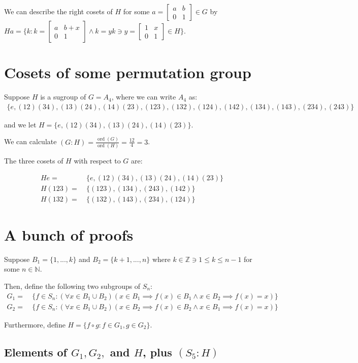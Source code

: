 \documentclass[12pt]{article}
\newcommand{\nats}{\mathbb{N}}
\newcommand{\ints}{\mathbb{Z}}
\newcommand{\glmatrix}[4]{\ensuremath{\begin{bmatrix} #1 & #2 \\ #3 & #4 \end{bmatrix}}}
\newcommand{\ord}{\operatorname{ord}}
\begin{document}
We can describe the right cosets of $H$ 
for some $a = \glmatrix{a}{b}{0}{1} \in G$
by $Ha = \Big\{k: k = \glmatrix{a}{b + x}{0}{1} \land k = yk \ni y = \glmatrix{1}{x}{0}{1} \in H \Big\}$.

\section{Cosets of some permutation group}

Suppose $H$ is a sugroup of $G = A_4$, where we can write $A_4$ as:
\begin{align} \label{a4}
	\{e, (12)(34), (13)(24),(14)(23),(123),(132),(124),(142),(134),(143),(234),(243)\}
\end{align}

and we let $H = \{ e, (12)(34), (13)(24),(14)(23) \}$.

We can calculate $(G:H) = \frac{\ord(G)}{\ord(H)} = \frac{12}{4} = 3$.

The three cosets of $H$ with respect to $G$ are:

\begin{align}
	He = &\ \{e, (12)(34), (13)(24),(14)(23) \} \\
	H(123) = &\ \{(123), (134), (243), (142) \} \\
	H(132) = &\ \{(132), (143),(234),(124) \}
\end{align}

\section{A bunch of proofs}

Suppose $B_1 = \{1, ..., k \}$ and $B_2 = \{k+1, ..., n\}$
where $k \in \ints \ni 1 \le k \le n -1$ for some $n \in \nats$.

Then, define the following two subgroups of $S_n$:
\begin{align}
	G_1 = &\ \{ f \in S_n: (\forall x \in B_1 \cup B_2)
	(x \in B_1 \implies f(x) \in B_1 \land x \in B_2 \implies f(x) = x) \} \\
	G_2 = &\ \{ f \in S_n: (\forall x \in B_1 \cup B_2)
	(x \in B_2 \implies f(x) \in B_2 \land x \in B_1 \implies f(x) = x) \}
\end{align}

Furthermore, define $H = \{ f \circ g: f \in G_1, g \in G_2 \}$.

\subsection{Elements of $G_1, G_2,$ and $H$, plus $(S_5:H)$}
\end{document}
